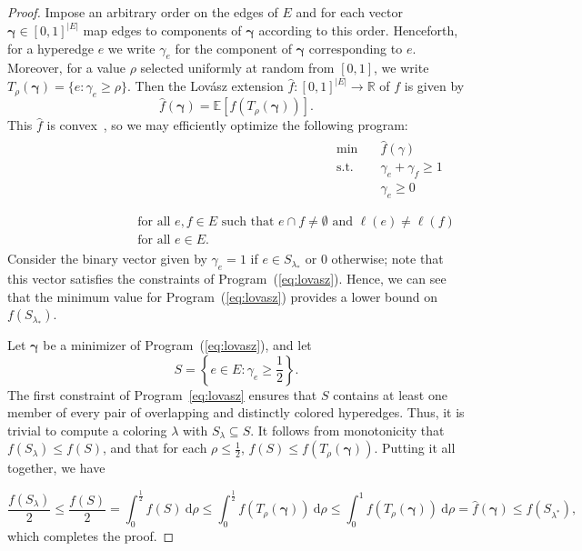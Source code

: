 \begin{proof}
    Impose an arbitrary order on the edges of $E$ and for each vector $\boldsymbol{\gamma} \in [0, 1]^{|E|}$ map edges to components of $\boldsymbol{\gamma}$ according to this order.
    Henceforth, for a hyperedge $e$ we write $\gamma_e$ for the component of $\boldsymbol{\gamma}$ corresponding to $e$. Moreover, for a
    value $\rho$ selected uniformly at random from $[0, 1]$, we write $T_\rho(\boldsymbol{\gamma}) = \{e \colon \gamma_e \geq \rho\}$.
    Then the Lov{\'a}sz extension $\hat{f}\colon [0, 1]^{|E|} \rightarrow \mathbb{R}$ of $f$ is given by
    \[
        \hat{f}(\boldsymbol{\gamma}) = \mathbb{E}[f(T_\rho(\boldsymbol{\gamma}))].
    \]
    This $\hat{f}$ is convex~\cite{lovasz1983submodular}, so we may efficiently optimize the following program:
    \begin{align}
        \label{eq:lovasz}
        \begin{aligned}
            \text{min} \quad  & \hat{f}(\gamma)                 \\
            \text{s.t.} \quad & \gamma_e + \gamma_f \geq 1\quad \\
                              & \gamma_e \geq 0                 \\
        \end{aligned}
        \begin{aligned}
             &                                                                                                         \\
             & \text{for all } e, f \in E \text{ such that } e \cap f \neq \emptyset \text{ and } \ell(e) \neq \ell(f) \\
             & \text{for all } e \in E.
        \end{aligned}
    \end{align}
    Consider the binary vector given by $\gamma_e = 1$ if $e \in S_{\lambda_*}$ or $0$ otherwise; note that this vector satisfies the constraints of Program~(\ref{eq:lovasz}). Hence, we can see that the minimum value for Program~(\ref{eq:lovasz}) provides a lower bound on $f(S_{\lambda_*})$.

    Let $\boldsymbol{\gamma}$ be a minimizer of Program~(\ref{eq:lovasz}), and let
    \[
        S = \left\{e \in E \colon \gamma_e \geq \frac{1}{2}\right\}.
    \]
    The first constraint of Program~\ref{eq:lovasz} ensures that $S$ contains at least one member of every pair of overlapping and distinctly colored hyperedges.
    Thus, it is trivial to compute a coloring $\lambda$ with $S_\lambda \subseteq S$.
    It follows from monotonicity that $f(S_\lambda) \leq f(S)$, and that for each $\rho \leq \frac{1}{2}$, $f(S) \leq f(T_\rho(\boldsymbol{\gamma}))$.
    Putting it all together, we have

    \[
        \frac{f(S_\lambda)}{2} \leq \frac{f(S)}{2} = \int_{0}^{\frac{1}{2}} f(S) \ \mathrm{d}\rho \leq \int_{0}^{\frac{1}{2}} f(T_\rho(\boldsymbol{\gamma})) \ \mathrm{d}\rho \leq \int_{0}^{1} f(T_\rho(\boldsymbol{\gamma})) \ \mathrm{d}\rho = \hat{f}(\boldsymbol{\gamma}) \leq f(S_{\lambda^*}),
    \]
    which completes the proof.

\end{proof}
